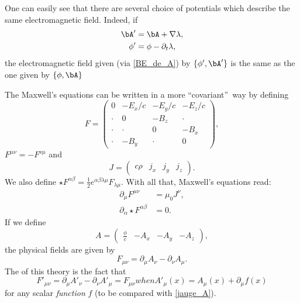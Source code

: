One can easily see that there are several choice of potentials which describe the same electromagnetic field. Indeed, if
\begin{subequations}\label{jauge_A}
\begin{align}
    \bA'&=\bA+\nabla\lambda,\\
    \phi'&=\phi-\partial_t\lambda,
\end{align}
\end{subequations}
the electromagnetic field given (via \eqref{BE_de_A}) by $\{\phi',\bA'\}$ is the same as the one given by $\{\phi,\bA\}$

The Maxwell's equations can be written in a more ``covariant''\ way by defining
\begin{equation}\label{def_F}
F=\begin{pmatrix}
0 & -E_x/c & -E_y/c & -E_z/c \\
\cdot & 0 & -B_z & \cdot \\
\cdot & \cdot & 0 & -B_x \\
\cdot & -B_y & \cdot & 0
\end{pmatrix},
\end{equation} $F^{\mu\nu}=-F^{\nu\mu}$ and
\[
 J=\begin{pmatrix}
c\rho & j_x & j_y & j_z
\end{pmatrix}.
\]
We also define $\star F^{\alpha\beta}=\frac{1}{2} e^{\alpha\beta\lambda\mu}F_{\lambda\mu}$. With all that, Maxwell's equations read:
\begin{equation}
\begin{split}
\partial_{\mu} F^{\mu\nu}&=\mu_0J^{\nu},\\
\partial_{\alpha}\star F^{\alpha\beta}&=0.
\end{split}
\end{equation}
If we define
\begin{equation}\label{def_A}
  A=\begin{pmatrix}
\frac{\displaystyle\phi}{\displaystyle c} & -A_x & -A_y & -A_z
\end{pmatrix},
\end{equation}
%
the physical fields are given by
\[
  F_{\mu\nu}=\partial_{\mu}A_{\nu}-\partial_{\nu}A_{\mu}.
\]
The  of this theory is the fact that
\begin{subequations}
\begin{equation}
  F'_{\mu\nu}=\partial_{\mu}A'_{\nu}-\partial_{\nu}A'_{\mu}=F_{\mu\nu}
\end{equation}
when
\begin{equation}
A'_{\mu}(x)=A_{\mu}(x)+\partial_{\mu}f(x)
\end{equation}
\end{subequations}
for any scalar \emph{function} $f$ (to be compared with \eqref{jauge_A}).

